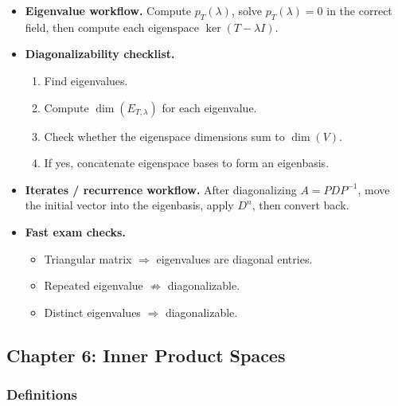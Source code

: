 \begin{itemize}[leftmargin=*]
\item \textbf{Eigenvalue workflow.} Compute $p_T(\lambda)$, solve $p_T(\lambda)=0$ in the correct field, then compute each eigenspace $\ker(T-\lambda I)$.

\item \textbf{Diagonalizability checklist.}
\begin{enumerate}[leftmargin=*]
\item Find eigenvalues.
\item Compute $\dim(E_{T,\lambda})$ for each eigenvalue.
\item Check whether the eigenspace dimensions sum to $\dim(V)$.
\item If yes, concatenate eigenspace bases to form an eigenbasis.
\end{enumerate}

\item \textbf{Iterates / recurrence workflow.} After diagonalizing $A=PDP^{-1}$, move the initial vector into the eigenbasis, apply $D^n$, then convert back.

\item \textbf{Fast exam checks.}
\begin{itemize}[leftmargin=*]
\item Triangular matrix $\Rightarrow$ eigenvalues are diagonal entries.
\item Repeated eigenvalue $\not\Rightarrow$ diagonalizable.
\item Distinct eigenvalues $\Rightarrow$ diagonalizable.
\end{itemize}
\end{itemize}

\subsection*{Chapter 6: Inner Product Spaces}

\subsubsection*{Definitions}

